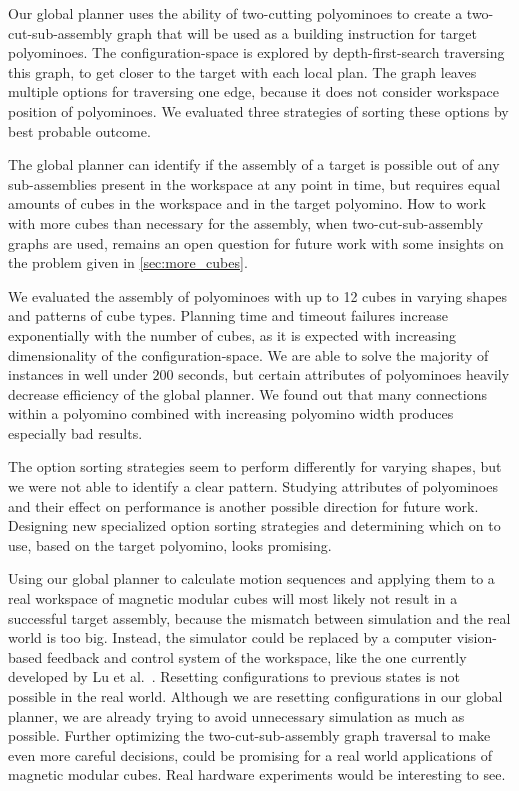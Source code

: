 Our global planner uses the ability of two-cutting polyominoes to create a two-cut-sub-assembly graph that will be used as a building instruction for target polyominoes.
The configuration-space is explored by depth-first-search traversing this graph, to get closer to the target with each local plan.
The graph leaves multiple options for traversing one edge, because it does not consider workspace position of polyominoes. 
We evaluated three strategies of sorting these options by best probable outcome.

The global planner can identify if the assembly of a target is possible out of any sub-assemblies present in the workspace at any point in time, but requires equal amounts of cubes in the workspace and in the target polyomino.
How to work with more cubes than necessary for the assembly, when two-cut-sub-assembly graphs are used, remains an open question for future work with some insights on the problem given in \autoref{sec:more_cubes}.

We evaluated the assembly of polyominoes with up to 12 cubes in varying shapes and patterns of cube types.
Planning time and timeout failures increase exponentially with the number of cubes, as it is expected with increasing dimensionality of the configuration-space.
We are able to solve the majority of instances in well under $200$ seconds, but certain attributes of polyominoes heavily decrease efficiency of the global planner.
We found out that many connections within a polyomino combined with increasing polyomino width produces especially bad results.

The option sorting strategies seem to perform differently for varying shapes, but we were not able to identify a clear pattern.
Studying attributes of polyominoes and their effect on performance is another possible direction for future work.
Designing new specialized option sorting strategies and determining which on to use, based on the target polyomino, looks promising. 

Using our global planner to calculate motion sequences and applying them to a real workspace of magnetic modular cubes will most likely not result in a successful target assembly, because the mismatch between simulation and the real world is too big.
Instead, the simulator could be replaced by a computer vision-based feedback and control system of the workspace, like the one currently developed by Lu et al.\ \cite{Lu2023}.
Resetting configurations to previous states is not possible in the real world.
Although we are resetting configurations in our global planner, we are already trying to avoid unnecessary simulation as much as possible.
Further optimizing the two-cut-sub-assembly graph traversal to make even more careful decisions, could be promising for a real world applications of magnetic modular cubes.
Real hardware experiments would be interesting to see.







